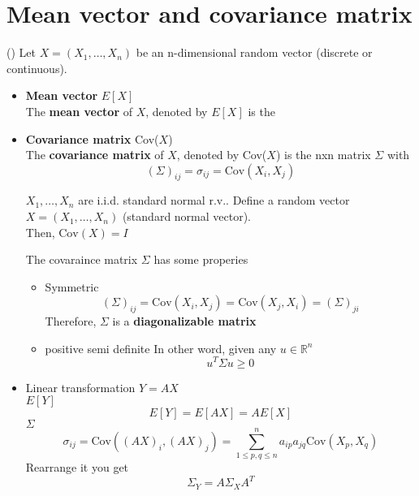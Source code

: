 \section{Mean vector and covariance matrix}
(\cite*{Und_Chatterjee})
Let \(X = (X_1, \dots, X_n)\) be an n-dimensional random vector (discrete or continuous). 
\begin{itemize}
    \item \textbf{Mean vector} \(E[X]\)\\
    The \textbf{mean vector} of  \(X\), denoted by \(E[X]\) is the  
    \item \textbf{Covariance matrix} Cov(\(X\))\\
    The \textbf{covariance matrix} of \(X\), denoted by Cov(\(X\)) is the nxn matrix \(\Sigma\) with 
    \[
        (\Sigma )_{ij} = \sigma_{ij} = \text{Cov} (X_i,X_j)
    \]   
    \begin{eg}
        \(X_1, \dots, X_n\) are i.i.d. standard normal r.v.. Define a random vector \(X = (X_1, \dots,X_n)\) (standard normal vector). \\
        Then, \(\text{Cov} (X) = I\)  
    \end{eg}
    \begin{remark}
        The covaraince matrix \(\Sigma \) has some properies  
        \begin{itemize}
            \item Symmetric
            \[
                (\Sigma )_{ij} = \text{Cov}(X_{i} ,X_{j} ) = \text{Cov} (X_{j} ,X_{i}) = (\Sigma)_{ji} 
            \]
            Therefore, \(\Sigma \) is a \textbf{diagonalizable matrix} 
            \item positive semi definite
                In other word, given any \(u \in \mathbb{R}^n\) 
                \[
                    u^T \Sigma u \geq 0
                \]
    

        \end{itemize}
    \end{remark}
    \item Linear transformation \(Y = AX\)\\ 
    \(E[Y]\) 
    \[
        E[Y]  = E[AX] = AE[X]
    \]
    \(\Sigma \) 
    \[
        \sigma_{ij} =  \text{Cov} ((AX)_i, (AX)_{j} ) = \sum_{1\leq p,q \leq n}^{n} a_{ip}a_{jq} \text{Cov}(X_{p} ,X_{q} ) 
    \]
    Rearrange it you get 
    \[
        \Sigma_Y = A \Sigma_X A^T
    \] 
\end{itemize}


